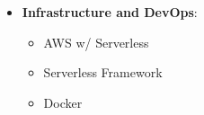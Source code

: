 \documentclass[11pt, twoside, a4paper]{article}
\newlength{\cvSideWidth}
\begin{document}
\begin{minipage}[t]{\cvSideWidth}
\begin{center}
\begin{flushleft}
\begin{itemize}
                \item \textbf{Infrastructure and DevOps}:
                \begin{itemize}
                    \item AWS w/ Serverless
                    \item Serverless Framework
                    \item Docker
                \end{itemize}

            \end{itemize}
        \end{flushleft}


    \end{center}
\end{minipage}
\hspace*{1.5cm} %
\end{document}
